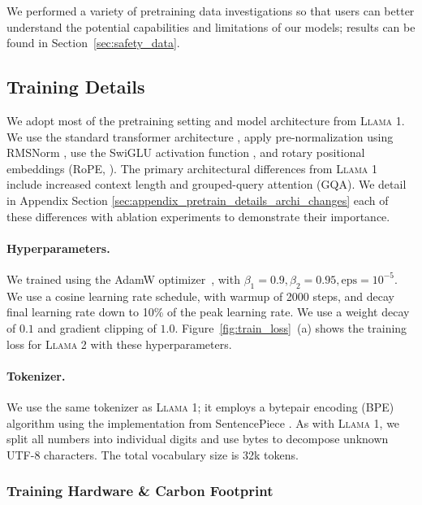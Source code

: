 We performed a variety of pretraining data investigations so that users can better understand the potential capabilities and limitations of our models; results can be found in Section~\ref{sec:safety_data}.

\subsection{Training Details}
\label{sec:training_details}
We adopt most of the pretraining setting and model architecture from \textsc{Llama 1}.  We use the standard transformer architecture \citep{vaswani2017attention}, apply pre-normalization using RMSNorm \citep{zhang2019root}, use the SwiGLU activation function \citep{shazeer2020glu}, and rotary positional embeddings (RoPE, \citealt{su2022roformer}). The primary architectural differences from \textsc{Llama 1} include increased context length and grouped-query attention (GQA). We detail in Appendix Section \ref{sec:appendix_pretrain_details_archi_changes} each of these differences with ablation experiments to demonstrate their importance.

\paragraph{Hyperparameters.} We trained using the AdamW optimizer~\citep{loshchilov2017decoupled}, with $\beta_1 = 0.9, \beta_2 = 0.95, \text{eps} = 10^{-5}$. We use a cosine learning rate schedule, with warmup of 2000 steps, and decay final learning rate down to 10\% of the peak learning rate. We use a weight decay of $0.1$ and gradient clipping of $1.0$. 
Figure~\ref{fig:train_loss}~(a) shows the training loss for \textsc{Llama 2} with these hyperparameters.

\paragraph{Tokenizer.} We use the same tokenizer as \textsc{Llama 1}; it employs a bytepair encoding (BPE) algorithm \citep{sennrich2016neural} using the implementation from SentencePiece \citep{kudo2018sentencepiece}. As with \textsc{Llama 1}, we split all numbers into individual digits and use bytes to decompose unknown UTF-8 characters. The total vocabulary size is 32k tokens.

\subsubsection{Training Hardware \& Carbon Footprint} 

